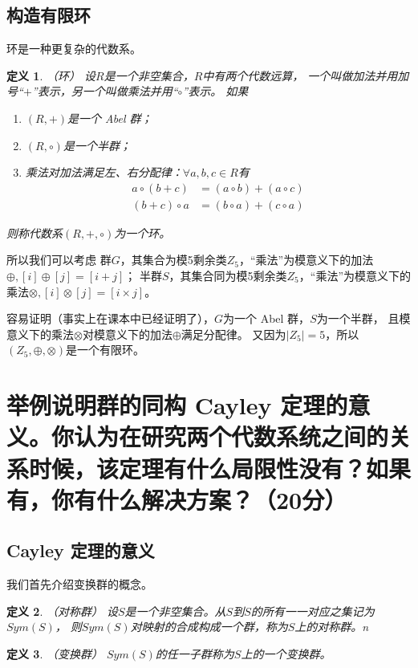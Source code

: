 \documentclass[12pt,onecolumn]{article}
\theoremstyle{plain}
\newtheorem{definition}{定义}[section]
\begin{document}
\subsection{构造有限环}
环是一种更复杂的代数系。
\begin{definition}{（环）}
 设$R$是一个非空集合，$R$中有两个代数远算，
 一个叫做加法并用加号“$+$”表示，另一个叫做乘法并用“$\circ$”表示。
 如果
 \begin{enumerate}[fullwidth,itemindent=\parindent,label=（\arabic*）]
 \item $(R, +)$是一个 Abel 群；
 \item $(R, \circ)$是一个半群；
 \item 乘法对加法满足左、右分配律：$\forall a, b, c \in R$有
 \begin{align*}
 a \circ (b + c) & = (a \circ b) + (a \circ c) \\
 (b + c) \circ a & = (b \circ a) + (c \circ a)
 \end{align*}
 \end{enumerate}
 则称代数系$(R, +, \circ)$为一个环。
\end{definition}

所以我们可以考虑
群$G$，其集合为模5剩余类$Z_5$，“乘法”为模意义下的加法$\oplus, [i] \oplus [j] = [i + j]$；
半群$S$，其集合同为模5剩余类$Z_5$，“乘法”为模意义下的乘法$\otimes, [i] \otimes [j] = [i \times j]$。

容易证明（事实上在课本中已经证明了），$G$为一个 Abel 群，$S$为一个半群，
且模意义下的乘法$\otimes$对模意义下的加法$\oplus$满足分配律。
又因为$|Z_5| = 5$，所以$(Z_5, \oplus, \otimes)$是一个有限环。

\section{举例说明群的同构 Cayley 定理的意义。你认为在研究两个代数系统之间的关系时候，该定理有什么局限性没有？如果有，你有什么解决方案？（20分）}

\subsection{Cayley 定理的意义}
我们首先介绍变换群的概念。

\begin{definition}{（对称群）}
 设$S$是一个非空集合。从$S$到$S$的所有一一对应之集记为$Sym(S)$，
 则$Sym(S)$对映射的合成构成一个群，称为$S$上的对称群。n
\end{definition}

\begin{definition}{（变换群）}
 $Sym(S)$的任一子群称为$S$上的一个变换群。
\end{definition}
\end{document}

